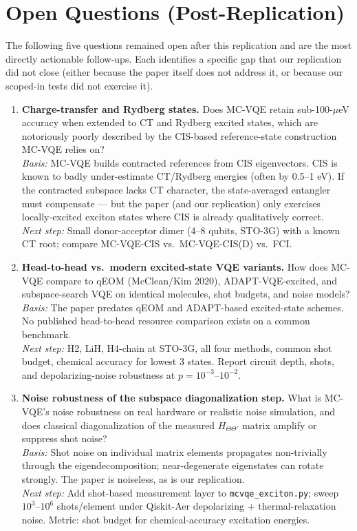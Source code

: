 \section*{Open Questions (Post-Replication)}

The following five questions remained open after this replication and are the
most directly actionable follow-ups. Each identifies a specific gap that our
replication did not close (either because the paper itself does not address it,
or because our scoped-in tests did not exercise it).

\begin{enumerate}

\item \textbf{Charge-transfer and Rydberg states.}
Does MC-VQE retain sub-100-$\mu$eV accuracy when extended to CT and Rydberg
excited states, which are notoriously poorly described by the CIS-based
reference-state construction MC-VQE relies on? \\
\emph{Basis:} MC-VQE builds contracted references from CIS eigenvectors. CIS is
known to badly under-estimate CT/Rydberg energies (often by 0.5--1 eV). If the
contracted subspace lacks CT character, the state-averaged entangler must
compensate --- but the paper (and our replication) only exercises
locally-excited exciton states where CIS is already qualitatively correct. \\
\emph{Next step:} Small donor-acceptor dimer (4--8 qubits, STO-3G) with a known
CT root; compare MC-VQE-CIS vs.\ MC-VQE-CIS(D) vs.\ FCI.

\item \textbf{Head-to-head vs.\ modern excited-state VQE variants.}
How does MC-VQE compare to qEOM (McClean/Kim 2020), ADAPT-VQE-excited, and
subspace-search VQE on identical molecules, shot budgets, and noise models? \\
\emph{Basis:} The paper predates qEOM and ADAPT-based excited-state schemes. No
published head-to-head resource comparison exists on a common benchmark. \\
\emph{Next step:} H2, LiH, H4-chain at STO-3G, all four methods, common shot
budget, chemical accuracy for lowest 3 states. Report circuit depth, shots,
and depolarizing-noise robustness at $p=10^{-3}$--$10^{-2}$.

\item \textbf{Noise robustness of the subspace diagonalization step.}
What is MC-VQE's noise robustness on real hardware or realistic noise
simulation, and does classical diagonalization of the measured
$H_{\Theta\Theta'}$ matrix amplify or suppress shot noise? \\
\emph{Basis:} Shot noise on individual matrix elements propagates non-trivially
through the eigendecomposition; near-degenerate eigenstates can rotate strongly.
The paper is noiseless, as is our replication. \\
\emph{Next step:} Add shot-based measurement layer to \texttt{mcvqe\_exciton.py};
sweep $10^3$--$10^6$ shots/element under Qiskit-Aer depolarizing +
thermal-relaxation noise. Metric: shot budget for chemical-accuracy excitation
energies.


\end{enumerate}
